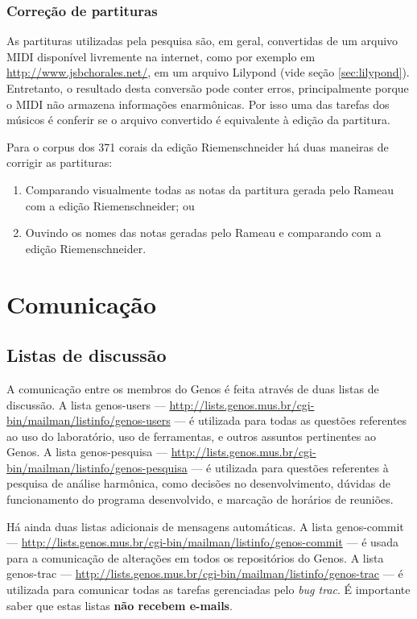 \documentclass[12pt,brazil]{book}
\newcommand{\eng}[1]{\textit{#1}}
\begin{document}
\subsection{Correção de partituras}
\label{sec:corr-de-part}

As partituras utilizadas pela pesquisa são, em geral, convertidas de
um arquivo MIDI disponível livremente na internet, como por exemplo em
\url{http://www.jsbchorales.net/}, em um arquivo Lilypond (vide seção
\ref{sec:lilypond}). Entretanto, o resultado desta conversão pode
conter erros, principalmente porque o MIDI não armazena informações
enarmônicas. Por isso uma das tarefas dos músicos é conferir se o
arquivo convertido é equivalente à edição da partitura.

Para o corpus dos 371 corais da edição Riemenschneider há duas
maneiras de corrigir as partituras:
\begin{enumerate}
\item Comparando visualmente todas as notas da partitura gerada pelo
  Rameau com a edição Riemenschneider; ou
\item Ouvindo os nomes das notas geradas pelo Rameau e comparando com
  a edição Riemenschneider.
\end{enumerate}

\chapter{Comunicação}
\label{cha:comunicacao}

\section{Listas de discussão}
\label{sec:listas-de-discussao}

A comunicação entre os membros do Genos é feita através de duas listas
de discussão. A lista genos-users ---
\url{http://lists.genos.mus.br/cgi-bin/mailman/listinfo/genos-users}
--- é utilizada para todas as questões referentes ao uso do
laboratório, uso de ferramentas, e outros assuntos pertinentes ao
Genos. A lista genos-pesquisa ---
\url{http://lists.genos.mus.br/cgi-bin/mailman/listinfo/genos-pesquisa}
--- é utilizada para questões referentes à pesquisa de análise
harmônica, como decisões no desenvolvimento, dúvidas de funcionamento
do programa desenvolvido, e marcação de horários de reuniões.

Há ainda duas listas adicionais de mensagens automáticas. A lista
genos-commit ---
\url{http://lists.genos.mus.br/cgi-bin/mailman/listinfo/genos-commit}
--- é usada para a comunicação de alterações em todos os repositórios
do Genos. A lista genos-trac ---
\url{http://lists.genos.mus.br/cgi-bin/mailman/listinfo/genos-trac}
--- é utilizada para comunicar todas as tarefas gerenciadas pelo
\eng{bug trac}. É importante saber que estas listas \textbf{não
  recebem e-mails}.
\end{document}
